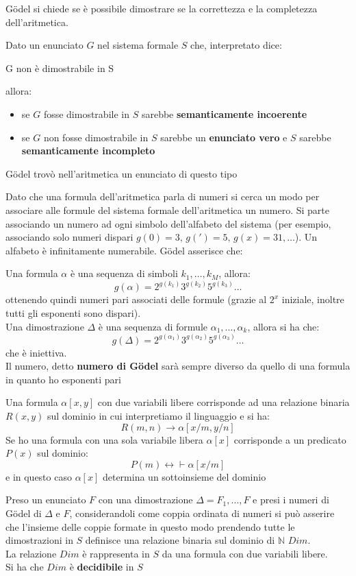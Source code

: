 \documentclass[a4paper,12pt, oneside]{book}
\begin{document}
\newpage
G\"{o}del si chiede se è possibile dimostrare se la correttezza e la completezza
dell'aritmetica.
\begin{teorema}
  Dato un enunciato $G$ nel sistema formale $S$ che, interpretato dice:
  \begin{center}
    G non è dimostrabile in S
  \end{center}
  allora:
  \begin{itemize}
    \item se $G$ fosse dimostrabile in $S$ sarebbe \textbf{semanticamente
      incoerente} 
    \item se $G$ non fosse dimostrabile in $S$ sarebbe un \textbf{enunciato
      vero} e $S$ sarebbe \textbf{semanticamente incompleto}
  \end{itemize}
  G\"{o}del trovò nell'aritmetica un enunciato di questo tipo
\end{teorema}
Dato che una formula dell'aritmetica parla di numeri si cerca un modo per
associare alle formule del sistema formale dell'aritmetica un numero. Si parte
associando un numero ad ogni simbolo dell'alfabeto del sistema (per esempio,
associando solo numeri dispari $g(0)=3,\,g(')=5,\,g(x)=31,\ldots$). Un alfabeto
è infinitamente numerabile. G\"{o}del asserisce che:
\begin{definizione}
  Una formula $\alpha$ è una sequenza di simboli $k_1,\ldots,k_M$, allora:
  \[g(\alpha)=2^{g(k_1)}3^{g(k_2)}5^{g(k_3)}\ldots\]
  ottenendo quindi numeri pari associati delle formule (grazie al
  $2^x$ iniziale, inoltre tutti gli esponenti sono dispari).\\
  Una dimostrazione $\Delta$ è una sequenza di formule
  $\alpha_1,\ldots,\alpha_k$, allora si ha che:
  \[g(\Delta)=2^{g(\alpha_1)}3^{g(\alpha_2)}5^{g(\alpha_3)}\ldots\]
  che è iniettiva.\\
  Il numero, detto \textbf{numero di G\"{o}del} sarà sempre diverso da quello di
  una formula in quanto ho esponenti pari
\end{definizione}
Una formula $\alpha[x,y]$ con due variabili libere corrisponde ad una relazione
binaria $R(x,y)$ sul dominio in cui interpretiamo il linguaggio e si ha:
\[R(m,n)\to\alpha[x/m,y/n]\]
Se ho una formula con una sola variabile libera $\alpha[x]$ corrisponde a un
predicato $P(x)$ sul dominio:
\[P(m)\leftrightarrow \vdash\alpha[x/m]\]
e in questo caso $\alpha[x]$ determina un sottoinsieme del dominio
\begin{definizione}
  Preso un enunciato $F$ con una dimostrazione $\Delta=F_1,\ldots,F$ e presi i
  numeri di G\"{o}del di $\Delta$ e $F$, considerandoli come coppia ordinata di
  numeri si può asserire che l'insieme delle coppie formate in questo modo
  prendendo tutte le dimostrazioni in $S$ definisce una relazione binaria sul
  dominio di $\mathbb{N}$ $Dim$.\\
  La relazione $Dim$ è rappresenta in $S$ da una formula con due variabili
  libere.\\
  Si ha che $Dim$ è \textbf{decidibile} in $S$
\end{definizione}
\end{document}
